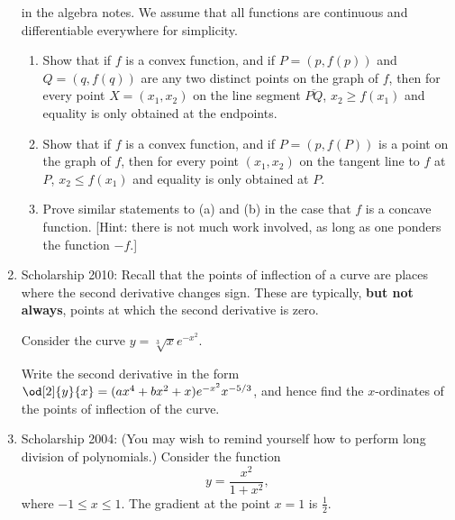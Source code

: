 \begin{enumerate}
        in the algebra notes. We assume that all functions are continuous and differentiable everywhere for simplicity.
    \begin{enumerate}
      \item Show that if $ f $ is a convex function, and if $ P = (p,f(p)) $ and $ Q = (q,f(q)) $ are any two distinct points
            on the graph of $ f $, then for every point $ X = (x_1, x_2) $ on the line segment $ \overline{PQ} $, $ x_2 \geq f(x_1) $
            and equality is only obtained at the endpoints.
      \item Show that if $ f $ is a convex function, and if $ P = (p,f(P)) $ is a point on the graph of $ f $, then for every
            point $ (x_1,x_2) $ on the tangent line to $ f $ at $ P $, $ x_2 \leq f(x_1) $ and equality is only obtained at $ P $.
      \item Prove similar statements to (a) and (b) in the case that $ f $ is a concave function. [Hint: there is not much work
            involved, as long as one ponders the function $ -f $.]
    \end{enumerate}
  \item Scholarship 2010: Recall that the points of inflection of a curve are places where the second derivative
        changes sign. These are typically, \textbf{but not always}, points at which the second derivative is zero.

        Consider the curve $ y = \sqrt[3]{x} e^{-x^2} $.

        Write the second derivative in the form $ \od[2]{y}{x} = (ax^4 + bx^2 + x)e^{-x^2} x^{-5/3} $, and hence
        find the $ x$-ordinates of the points of inflection of the curve.
  \item Scholarship 2004: (You may wish to remind yourself how to perform long division of polynomials.) Consider the function
        \begin{displaymath}
          y = \frac{x^2}{1 + x^2},
        \end{displaymath}
        where $ -1 \leq x \leq 1 $. The gradient at the point $ x = 1 $ is $ \frac{1}{2} $.


\end{enumerate}
